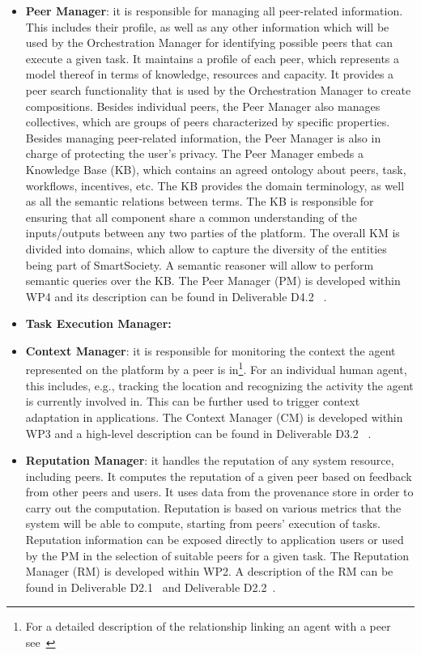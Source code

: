 \begin{itemize}
\item \textbf{Peer Manager}: it is responsible for managing all peer-related information. This includes their profile, as well as any other information which will be used by the Orchestration Manager for identifying possible peers that can execute a given task.  It maintains a profile of each peer, which
represents a model thereof in terms of knowledge, resources and
capacity. It provides a peer search functionality that is used by the Orchestration Manager to create compositions. Besides individual peers, the Peer Manager also manages collectives, which are groups of peers characterized by specific properties. Besides managing peer-related information, the Peer Manager is also in charge of protecting the user's privacy. The Peer Manager embeds a Knowledge Base (KB), which contains an agreed ontology about peers, task, workflows, incentives, etc. The KB provides the domain terminology, as well as all the semantic relations between terms. The KB is responsible for ensuring that all component share a common understanding of the inputs/outputs between any two parties of the platform. The overall KM is divided into domains, which allow to capture the diversity of the entities being part of SmartSociety. A semantic reasoner will allow to perform semantic queries over the KB. The Peer Manager (PM) is developed within WP4 and its description can be found in Deliverable D4.2~\cite{D4.2} .

\item \textbf{Task Execution Manager:} 

\item \textbf{Context Manager}: it is responsible for monitoring the context the agent represented on the platform by a peer is in\footnote{For a detailed description of the relationship linking an agent with a peer see~\cite{D2.2}}. For an individual human agent, this includes, e.g., tracking the location and recognizing the activity the agent is currently involved in. This can be further used to trigger context adaptation in applications. The Context Manager (CM) is developed within WP3 and a high-level description can be found in Deliverable D3.2~
\cite{D3.2}.

\item \textbf{Reputation Manager}: it handles the reputation of any system resource, including peers. It computes the reputation of a given peer based on feedback from other peers and users. It uses data from the provenance store in order to carry out the computation. Reputation is based on various metrics that the system will be able to compute, starting from peers' execution of tasks. Reputation information can be exposed directly to application users or used by the PM in the selection of suitable peers for a given task. The Reputation Manager (RM) is developed within WP2. A description of the RM can be found in Deliverable D2.1~\cite{d2.1} and Deliverable D2.2~\cite{D2.2}.


\end{itemize}

